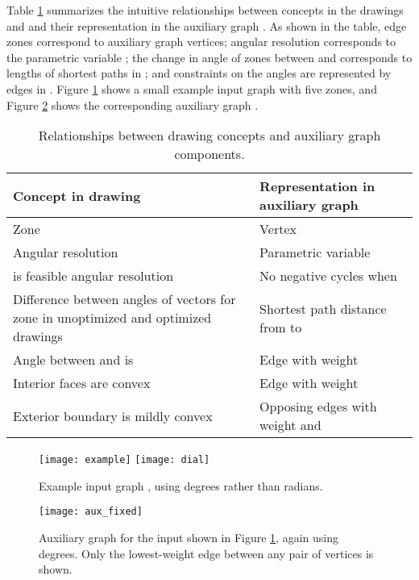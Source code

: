 \documentclass[11pt,letter]{article}
\begin{document}
Table \ref{table:relationships} summarizes the intuitive relationships between concepts in the drawings  and  and their representation in the auxiliary graph .  As shown in the table, edge zones correspond to auxiliary graph vertices; angular resolution corresponds to the parametric variable ; the change in angle of zones between  and  corresponds to lengths of shortest paths in ; and constraints on the angles are represented by edges in .  Figure \ref{figure:example_input} shows a small example input graph  with five zones, and Figure \ref{figure:example_aux} shows the corresponding auxiliary graph .

\begin{table}
\centering
\begin{tabular}{|p{3in}|p{3in}|}
\hline
\bf{Concept in drawing} & \bf{Representation in auxiliary graph} \\ \hline \hline
Zone  & Vertex  \\ \hline
Angular resolution & Parametric variable  \\ \hline
 is feasible angular resolution & No negative cycles when  \\ \hline
Difference between angles of vectors for zone  in unoptimized and optimized drawings & Shortest path distance  from  to  \\ \hline
Angle between  and  is  & Edge with weight  \\ \hline
Interior faces are convex & Edge with weight  \\ \hline
Exterior boundary is mildly convex & Opposing edges with weight   and  \\ \hline
\end{tabular}
\caption{Relationships between drawing concepts and auxiliary graph components.}
\label{table:relationships}
\end{table}

\begin{figure}[t]
\centering
\vspace{.5in}
\texttt{[image: example]} \hspace{.5in} \texttt{[image: dial]}
\caption{Example input graph , using degrees rather than radians.}
\label{figure:example_input}
\end{figure}

\begin{figure}[t]
\centering
\texttt{[image: aux\_fixed]}
\caption{Auxiliary graph  for the input shown in Figure \ref{figure:example_input}, again using degrees.  Only the lowest-weight edge between any pair of vertices is shown.}
\label{figure:example_aux}
\end{figure}
\end{document}
